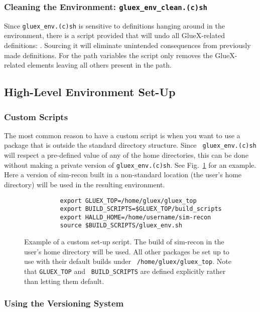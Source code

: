 \documentclass[12pt]{article}
\begin{document}
\subsubsection{Cleaning the Environment: {\tt gluex\_env\_clean.(c)sh}}

Since {\tt gluex\_env.(c)sh} is sensitive to definitions hanging
around in the environment, there is a script provided that will undo
all GlueX-related definitions: . Sourcing
it will eliminate unintended consequences from previously made
definitions. For the path variables the script only removes the
GlueX-related elements leaving all others present in the path.

\subsection{High-Level Environment Set-Up}

\subsubsection{Custom Scripts}\label{section:custom-scripts}

The most common reason to have a custom script is when you want to use
a package that is outside the standard directory structure. Since {\tt
  gluex\_env.(c)sh} will respect a pre-defined value of any of the
home directories, this can be done without making a private version of
{\tt gluex\_env.(c)sh}. See Fig.~\ref{figure:custom-script} for an
example. Here a version of sim-recon built in a non-standard location
(the user's home directory) will be used in the resulting environment.

\begin{figure}
\begin{verbatim}
          export GLUEX_TOP=/home/gluex/gluex_top
          export BUILD_SCRIPTS=$GLUEX_TOP/build_scripts
          export HALLD_HOME=/home/username/sim-recon
          source $BUILD_SCRIPTS/gluex_env.sh
\end{verbatim}
\caption{Example of a custom set-up script. The build of sim-recon in
  the user's home directory will be used. All other packages be set up
  to use with their default builds under {\tt
    /home/gluex/gluex\_top}. Note that {\tt GLUEX\_TOP} and {\tt
  BUILD\_SCRIPTS} are defined explicitly rather than letting them
default.}\label{figure:custom-script}
\end{figure}

\subsubsection{Using the Versioning System}\label{section:env-use-versioning}
\end{document}
